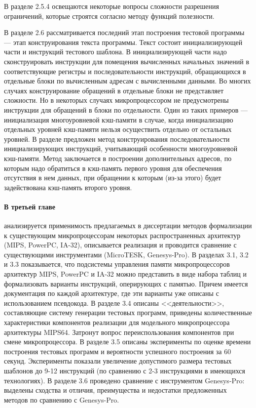\documentclass[14pt,autoref,href
,facsimile
]{disser}
\begin{document}
В разделе 2.5.4 освещаются некоторые вопросы сложности разрешения ограничений, которые строятся согласно методу функций полезности.


В разделе 2.6 рассматривается последний этап построения тестовой программы --- этап конструирования текста программы. Текст состоит инициализирующей части и инструкций тестового шаблона. В инициализирующей части надо сконструировать инструкции для помещения вычисленных начальных значений в соответствующие регистры и последовательности инструкций, обращающихся в отдельные блоки по вычисленным адресам с вычисленными данными. Во многих случаях конструирование обращений в отдельные блоки не представляет сложности. Но в некоторых случаях микропроцессором не предусмотрены инструкции для обращений в блоки по отдельности. Один из таких примеров --- инициализация многоуровневой кэш-памяти в случае, когда инициализацию отдельных уровней кэш-памяти нельзя осуществить отдельно от остальных уровней. В разделе предложен метод конструирования последовательности инициализирующих инструкций, учитывающий особенности многоуровневой кэш-памяти. Метод заключается в построении дополнительных адресов, по которым надо обратиться в кэш-память первого уровня для обеспечения отсутствия в нем данных, при обращении к которым (из-за этого) будет задействована кэш-память второго уровня.

\paragraph{В третьей главе} анализируется применимость предлагаемых в диссертации методов формализации к существующим микропроцессорам некоторых распространенных архитектур (MIPS, PowerPC, IA-32), описывается реализация и проводится сравнение с существующими инструментами (MicroTESK, Genesys-Pro). В разделах 3.1, 3.2 и 3.3 показывается, что подсистемы управления памяти микропроцессоров архитектур MIPS, PowerPC и IA-32 можно представить в виде набора таблиц и формализовать варианты инструкций, оперирующих с памятью. Причем имеется документация по каждой архитектуре, где эти варианты уже описаны с использованием псевдокода. В разделе 3.4 описаны <<деятельности>>, составляющие систему генерации тестовых программ, приведены количественные характеристики компонентов реализации для модельного микропроцессора архитектуры MIPS64. Затронут вопрос переиспользования компонентов при смене микропроцессора. В разделе 3.5 описаны эксперименты по оценке времени построения тестовых программ и вероятности успешного построения за 60 секунд. Эксперименты показали увеличение допустимого размера тестовых шаблонов до 9-12 инструкций (по сравнению с 2-3 инструкциями в имеющихся технологиях). В разделе 3.6 проведено сравнение с инструментом Genesys-Pro: выделены сходства и отличия, преимущества и недостатки предложенных методов по сравнению с Genesys-Pro.
\end{document}
